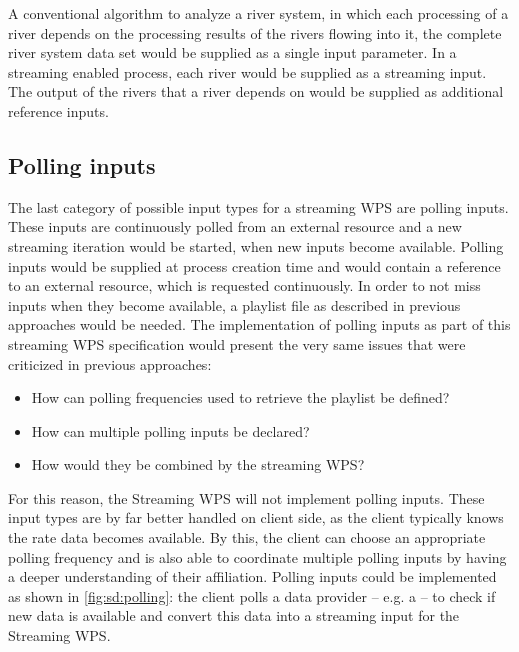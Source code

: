     A conventional algorithm to analyze a river system, in which each processing of a river depends on the processing results of the rivers flowing into it, the complete river system data set would be supplied as a single input parameter. In a streaming enabled process, each river would be supplied as a streaming input. The output of the rivers that a river depends on would be supplied as additional reference inputs.

  \subsection{Polling inputs}
    \label{sec:stream:input:polling}
    The last category of possible input types for a streaming \ac{WPS} are polling inputs. These inputs are continuously polled from an external resource and a new streaming iteration would be started, when new inputs become available. Polling inputs would be supplied at process creation time and would contain a reference to an external resource, which is requested continuously. In order to not miss inputs when they become available, a playlist file as described in previous approaches \citep{foerster2012live} would be needed. The implementation of polling inputs as part of this streaming \ac{WPS} specification would present the very same issues that were criticized in previous approaches:

    \begin{itemize}
      \item How can polling frequencies used to retrieve the playlist be defined?
      \item How can multiple polling inputs be declared?
      \item How would they be combined by the streaming \ac{WPS}?
    \end{itemize}

    For this reason, the Streaming \ac{WPS} will not implement polling inputs. These input types are by far better handled on client side, as the client typically knows the rate data becomes available. By this, the client can choose an appropriate polling frequency and is also able to coordinate multiple polling inputs by having a deeper understanding of their affiliation. Polling inputs could be implemented as shown in \cref{fig:sd:polling}: the client polls a data provider -- e.g. a  -- to check if new data is available and convert this data into a streaming input for the Streaming \ac{WPS}.

